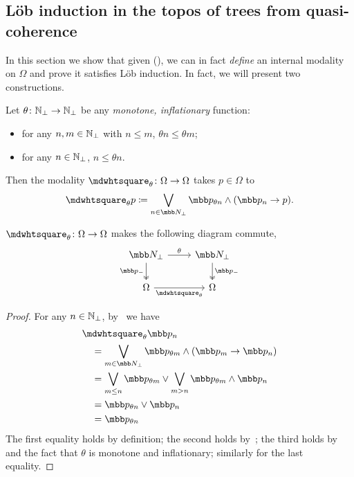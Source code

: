 \subsection{L\"ob induction in the topos of trees from quasi-coherence}\label{subsec:lobindfortree}

In this section we show that given (\AxiomGR), we can in fact \emph{define} an internal modality on $\Omega$ and prove it satisfies L\"ob induction. In fact, we will present two constructions. 

\begin{construction}\label{consprop}
  Let $\theta \colon \mathbb{N}_\bot \to \mathbb{N}_\bot$ be any \emph{monotone, inflationary} function: 
  \begin{itemize}
    \item for any $n,m\in\mathbb{N}_\bot$ with $n\le m$, $\theta n \le \theta m$;
    \item for any $n\in\mathbb{N}_\bot$, $n \le \theta n$.
  \end{itemize}
  Then the modality $\bx_\theta \colon \Omega \to \Omega$ takes $p\in\Omega$ to
  \[ \bx_\theta p \coloneq \bigvee_{n\in\ovob} \mbb p_{\theta n} \wedge (\mbb p_{n} \to p). \]
\end{construction}

\begin{proposition}\label{modalityonrepre}
  $\bx_\theta \colon \Omega \to \Omega$ makes the following diagram commute,
  \[ 
  \begin{tikzcd}
    \ovob \ar[d, two heads, "\mbb p_-"'] \ar[r, "\theta"] & \ovob \ar[d, two heads, "\mbb p_-"] \\
    \Omega \ar[r, "\bx_\theta"'] & \Omega
  \end{tikzcd}
  \]
\end{proposition}
\begin{proof}
  For any $n\in\mathbb{N}_\bot$, by~ we have 
  \begin{align*}
    &\bx_\theta\mbb p_{n} \\
    &\quad= \bigvee_{m\in\ovob} \mbb p_{\theta m} \wedge (\mbb p_{m} \to \mbb p_{n}) \\ 
    &\quad= \bigvee_{m \le n} \mbb p_{\theta m} \vee \bigvee_{m > n} \mbb p_{\theta m} \wedge \mbb p_{n} \\ 
    &\quad= \mbb p_{\theta n} \vee \mbb p_{n} \\ 
    &\quad= \mbb p_{\theta n}
  \end{align*}
  The first equality holds by definition; the second holds by~; the third holds by~ and the fact that $\theta$ is monotone and inflationary; similarly for the last equality.
\end{proof}

